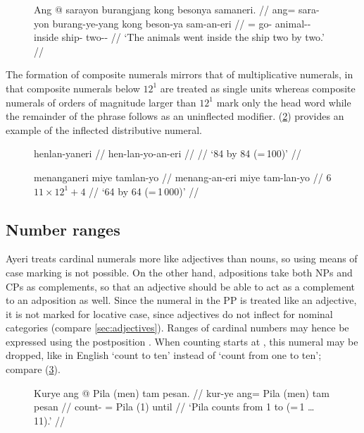 \begin{figure}[h]
\ex\label{ex:distnum}
\begingl
	\gla Ang @ sarayon burangjang kong besonya samaneri. //
	\glb ang= sara-yon burang-ye-yang kong beson-ya sam-an-eri //
	\glc \AgtT{}= go-\TplN{} animal-\Pl{}-\Aarg{} inside ship-\Loc{} 
		two-\Nmlz{}-\Ins{} //
	\glft `The animals went inside the ship two by two.' //
\endgl
\xe
\end{figure}

The formation of composite numerals mirrors that of multiplicative
numerals, in that composite numerals below $12^1$ are treated as single units
whereas composite numerals of orders of magnitude larger than $12^1$ mark only
the head word while the remainder of the phrase follows as an uninflected
modifier. (\ref{ex:distnuminfl}) provides an example of the inflected
distributive numeral.

\begin{figure}[h]
\pex\label{ex:distnuminfl}
\a\begingl
	\gla henlan-yaneri //
	\glb hen-lan-yo-an-eri //
	 //
	\glft `84 by 84 (=\,100)' //
\endgl

\a\begingl
	\gla menanganeri miye tamlan-yo //
	\glb menang-an-eri miye tam-lan-yo //
	 {$6$} {$11 \times 12^1 + 4$} //
	\glft `6\elv{}4 by 6\elv{}4 (=\,1\,000)' //
\endgl
\xe
\end{figure}

\subsection{Number ranges}

Ayeri treats cardinal numerals more like adjectives than nouns, so using means
of case marking is not possible. On the other hand, adpositions take both NPs
and CPs as complements, so that an adjective should be able to act as a
complement to an adposition as well. Since the numeral in the PP is treated
like an adjective, it is not marked for locative case, since adjectives do not
inflect for nominal categories (compare \autoref{sec:adjectives}). Ranges of
cardinal numbers may hence be expressed using the postposition
. When counting starts at ,
this numeral may be dropped, like in English `count to ten' instead of `count
from one to ten'; compare (\ref{ex:numstretch}).

\begin{figure}[h]
\ex\label{ex:numstretch}
\begingl
	\gla Kurye ang @ Pila \textup{(}men\textup{)} tam pesan. //
	\glb kur-ye ang= Pila (men) tam pesan //
	\glc count-\TsgF{} \Aarg{}= Pila (1) \elv{} until //
	\glft `Pila counts from 1 to \elv{} (=\,1 … 11).' //
\endgl
\xe
\end{figure}

